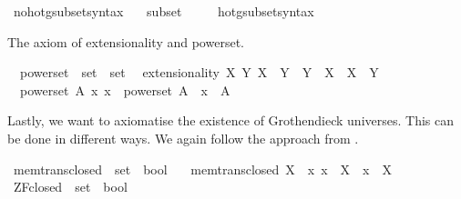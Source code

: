 \begin{isabellebody}
\isanewline
{}\isamarkupfalse%
\ no{\isacharunderscore}{\kern0pt}hotg{\isacharunderscore}{\kern0pt}subset{\isacharunderscore}{\kern0pt}syntax\ \ \isamarkupfalse%
\ subset\ {\isacharparenleft}{\kern0pt}\ {\isachardoublequoteopen}{\isasymsubseteq}{\isachardoublequoteclose}\ {}{}{\isacharparenright}{\kern0pt}\ \isamarkupfalse%
\isanewline
\isanewline
{}\isamarkupfalse%
\ hotg{\isacharunderscore}{\kern0pt}subset{\isacharunderscore}{\kern0pt}syntax%
\begin{isamarkuptext}%
The axiom of extensionality and powerset.%
\end{isamarkuptext}\isamarkuptrue%
\isamarkupfalse%
\isanewline
\ \ powerset\ {\isacharcolon}{\kern0pt}{\isacharcolon}{\kern0pt}\ {\isacartoucheopen}set\ {\isasymRightarrow}\ set{\isacartoucheclose}\isanewline
{}\isanewline
\ \ extensionality{\isacharcolon}{\kern0pt}\ {\isachardoublequoteopen}{\isasymforall}X\ Y{\isachardot}{\kern0pt}\ X\ {\isasymsubseteq}\ Y\ {\isasymlongrightarrow}\ Y\ {\isasymsubseteq}\ X\ {\isasymlongrightarrow}\ X\ {\isacharequal}{\kern0pt}\ Y{\isachardoublequoteclose}\ \isanewline
\ \ powerset{\isacharcolon}{\kern0pt}\ {\isachardoublequoteopen}{\isasymforall}A\ x{\isachardot}{\kern0pt}\ x\ {\isasymin}\ powerset\ A\ {\isasymlongleftrightarrow}\ x\ {\isasymsubseteq}\ A{\isachardoublequoteclose}%
\begin{isamarkuptext}%
Lastly, we want to axiomatise the existence of Grothendieck universes.
This can be done in different ways. We again follow the approach from
\cite{brown_et_al:LIPIcs:2019:11064}.%
\end{isamarkuptext}\isamarkuptrue%
\isamarkupfalse%
\ mem{\isacharunderscore}{\kern0pt}trans{\isacharunderscore}{\kern0pt}closed\ {\isacharcolon}{\kern0pt}{\isacharcolon}{\kern0pt}\ {\isacartoucheopen}set\ {\isasymRightarrow}\ bool{\isacartoucheclose}\isanewline
\ \ \ {\isachardoublequoteopen}mem{\isacharunderscore}{\kern0pt}trans{\isacharunderscore}{\kern0pt}closed\ X\ {\isasymequiv}\ {\isacharparenleft}{\kern0pt}{\isasymforall}x{\isachardot}{\kern0pt}\ x\ {\isasymin}\ X\ {\isasymlongrightarrow}\ x\ {\isasymsubseteq}\ X{\isacharparenright}{\kern0pt}{\isachardoublequoteclose}\isanewline
\isanewline
{}\isamarkupfalse%
\ ZF{\isacharunderscore}{\kern0pt}closed\ {\isacharcolon}{\kern0pt}{\isacharcolon}{\kern0pt}\ {\isacartoucheopen}set\ {\isasymRightarrow}\ bool{\isacartoucheclose}\isanewline

\end{isabellebody}
